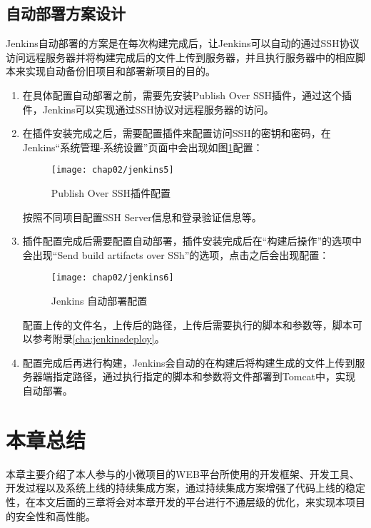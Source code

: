 \subsection{自动部署方案设计}
Jenkins自动部署的方案是在每次构建完成后，让Jenkins可以自动的通过SSH协议访问远程服务器并将构建完成后的文件上传到服务器，并且执行服务器中的相应脚本来实现自动备份旧项目和部署新项目的目的。
\begin{enumerate}
\item 在具体配置自动部署之前，需要先安装Publish Over SSH插件，通过这个插件，Jenkins可以实现通过SSH协议对远程服务器的访问。
\item 在插件安装完成之后，需要配置插件来配置访问SSH的密钥和密码，在Jenkins“系统管理-系统设置”页面中会出现如图\ref{fig:jenkins5}配置：
\begin{figure}[H] %
  \centering
  \texttt{[image: chap02/jenkins5]}
  \caption{Publish Over SSH插件配置}
  \label{fig:jenkins5}
\end{figure}
按照不同项目配置SSH Server信息和登录验证信息等。
\item 插件配置完成后需要配置自动部署，插件安装完成后在“构建后操作”的选项中会出现“Send build artifacts over SSh”的选项，点击之后会出现配置：
\begin{figure}[H] %
  \centering
  \texttt{[image: chap02/jenkins6]}
  \caption{Jenkins 自动部署配置}
  \label{fig:jenkins6}
\end{figure}
配置上传的文件名，上传后的路径，上传后需要执行的脚本和参数等，脚本可以参考附录\ref{cha:jenkinsdeploy}。
\item 配置完成后再进行构建，Jenkins会自动的在构建后将构建生成的文件上传到服务器端指定路径，通过执行指定的脚本和参数将文件部署到Tomcat中，实现自动部署。
\end{enumerate}

\section{本章总结}
本章主要介绍了本人参与的小微项目的WEB平台所使用的开发框架、开发工具、开发过程以及系统上线的持续集成方案，通过持续集成方案增强了代码上线的稳定性，在本文后面的三章将会对本章开发的平台进行不通层级的优化，来实现本项目的安全性和高性能。